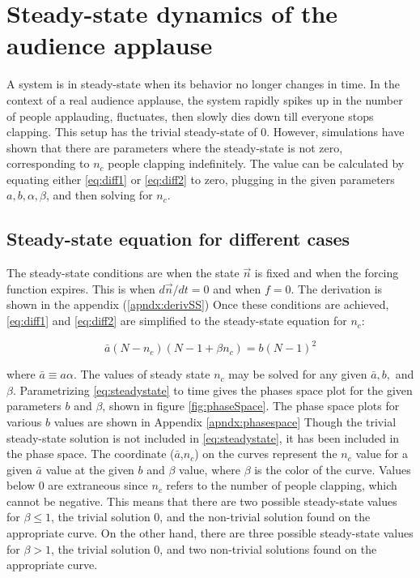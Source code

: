 \chapter{Steady-state dynamics of the audience applause}
\label{chap3}

\hspace{\parindent} A system is in steady-state when its behavior no longer changes in time. In the context of a real audience applause, the system rapidly spikes up in the number of people applauding, fluctuates, then slowly dies down till everyone stops clapping. This setup has the trivial steady-state of $0$.
However, simulations have shown that there are parameters where the steady-state is not zero, corresponding to $n_{c}$ people clapping indefinitely.
The value can be calculated by equating either \eqref{eq:diff1} or \eqref{eq:diff2} to zero, plugging in the given parameters $a, b, \alpha, \beta$, and then solving for $n_{c}$.

\section{Steady-state equation for different cases}

\hspace{\parindent} The steady-state conditions are when the state $\vec{n}$ is fixed and when the forcing function expires. 
This is when $d\vec{n}/dt = 0$ and when $f=0$.
The derivation is shown in the appendix (\ref{apndx:derivSS})
Once these conditions are achieved, \eqref{eq:diff1} and \eqref{eq:diff2} are simplified to the steady-state equation for $n_c$:

\begin{equation}\label{eq:steadystate}
\bar{a}(N-n_{c})(N-1 + \beta n_{c}) = b(N-1)^{2}
\end{equation}

where $\bar{a}\equiv a\alpha$. 
The values of steady state $n_{c}$ may be solved for any given $\bar{a},b,$ and $\beta$.
Parametrizing \eqref{eq:steadystate} to time gives the phases space plot for the given parameters $b$ and $\beta$, shown in figure \ref{fig:phaseSpace}.
The phase space plots for various $b$ values are shown in Appendix \ref{apndx:phasespace}
Though the trivial steady-state solution is not included in \eqref{eq:steadystate}, it has been included in the phase space.
The coordinate ($\bar{a}$,$n_{c}$) on the curves represent the $n_{c}$ value for a given $\bar{a}$ value at the given $b$ and $\beta$ value, where $\beta$ is the color of the curve.
Values below $0$ are extraneous since $n_{c}$ refers to the number of people clapping, which cannot be negative.
This means that there are two possible steady-state values for $\beta \leq 1$, the trivial solution $0$, and the non-trivial solution found on the appropriate curve.
On the other hand, there are three possible steady-state values for $\beta > 1$, the trivial solution $0$, and two non-trivial solutions found on the appropriate curve.


